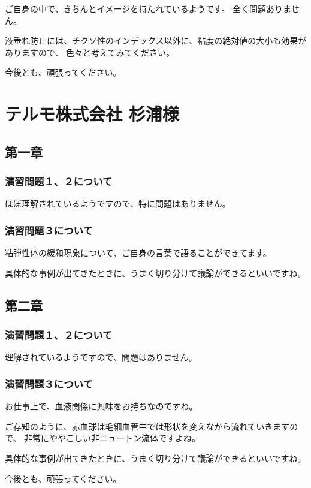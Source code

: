 \documentclass[uplatex,dvipdfmx,a4paper,11pt]{jsreport}
\begin{document}
ご自身の中で、きちんとイメージを持たれているようです。
全く問題ありません。

液垂れ防止には、チクソ性のインデックス以外に、粘度の絶対値の大小も効果がありますので、
色々と考えてみてください。

今後とも、頑張ってください。


\clearpage

\section*{テルモ株式会社 杉浦様}
\subsection*{第一章}
\subsubsection*{演習問題１、２について}
ほぼ理解されているようですので、特に問題はありません。

\subsubsection*{演習問題３について}
粘弾性体の緩和現象について、ご自身の言葉で語ることができてます。

具体的な事例が出てきたときに、うまく切り分けて議論ができるといいですね。

\subsection*{第二章}
\subsubsection*{演習問題１、２について}
理解されているようですので、問題はありません。

\subsubsection*{演習問題３について}

お仕事上で、血液関係に興味をお持ちなのですね。

ご存知のように、赤血球は毛細血管中では形状を変えながら流れていきますので、
非常にややこしい非ニュートン流体ですよね。

具体的な事例が出てきたときに、うまく切り分けて議論ができるといいですね。

今後とも、頑張ってください。
\end{document}
